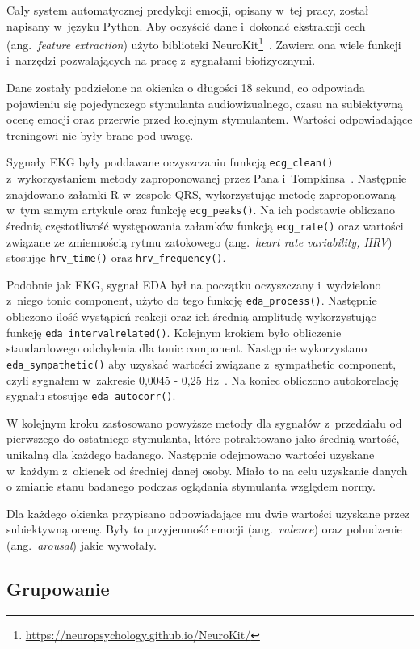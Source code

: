 Cały system automatycznej predykcji emocji, opisany w~tej pracy, został napisany w~języku Python.
Aby oczyścić dane i~dokonać ekstrakcji cech (ang.~\textit{feature extraction}) użyto biblioteki NeuroKit\footnote{\url{https://neuropsychology.github.io/NeuroKit/}}~\cite{Neurokit}.
Zawiera ona wiele funkcji i~narzędzi pozwalających na pracę z~sygnałami biofizycznymi.

Dane zostały podzielone na okienka o długości 18 sekund, co odpowiada pojawieniu się pojedynczego stymulanta audiowizualnego, czasu na subiektywną ocenę emocji oraz przerwie przed kolejnym stymulantem.
Wartości odpowiadające treningowi nie były brane pod uwagę.

Sygnały EKG były poddawane oczyszczaniu funkcją \texttt{ecg\_clean()} z~wykorzystaniem metody zaproponowanej przez Pana i~Tompkinsa~\cite{Pan1985}.
Następnie znajdowano załamki R w~zespole QRS, wykorzystując metodę zaproponowaną w~tym samym artykule oraz funkcję \texttt{ecg\_peaks()}.
Na ich podstawie obliczano średnią częstotliwość występowania załamków funkcją \texttt{ecg\_rate()} oraz wartości związane ze zmiennością rytmu zatokowego (ang.~\textit{heart rate variability, HRV}) stosując \texttt{hrv\_time()} oraz \texttt{hrv\_frequency()}.

Podobnie jak EKG, sygnał EDA był na początku oczyszczany i~wydzielono z~niego tonic component, użyto do tego funkcję \texttt{eda\_process()}.
Następnie obliczono ilość wystąpień reakcji oraz ich średnią amplitudę wykorzystując funkcję \texttt{eda\_intervalrelated()}.
Kolejnym krokiem było obliczenie standardowego odchylenia dla tonic component.
Następnie wykorzystano \texttt{eda\_sympathetic()} aby uzyskać wartości związane z~sympathetic component, czyli sygnałem w~zakresie 0,0045 - 0,25 Hz~\cite{Posada2016}.
Na koniec obliczono autokorelację sygnału stosując \texttt{eda\_autocorr()}.

W kolejnym kroku zastosowano powyższe metody dla sygnałów z~przedziału od pierwszego do ostatniego stymulanta, które potraktowano jako średnią wartość, unikalną dla każdego badanego.
Następnie odejmowano wartości uzyskane w~każdym z~okienek od średniej danej osoby.
Miało to na celu uzyskanie danych o zmianie stanu badanego podczas oglądania stymulanta względem normy.

Dla każdego okienka przypisano odpowiadające mu dwie wartości uzyskane przez subiektywną ocenę.
Były to przyjemność emocji (ang.~\textit{valence}) oraz pobudzenie (ang.~\textit{arousal}) jakie wywołały.

\subsection{Grupowanie}\label{subsec:grupowanie}


